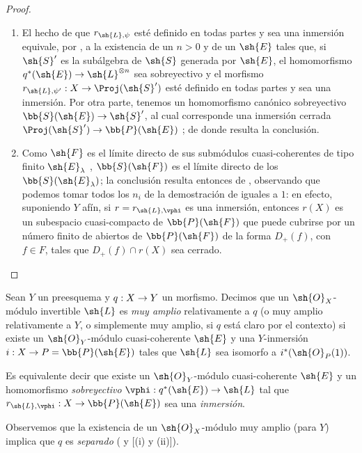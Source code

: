 \documentclass[oneside,10pt]{amsart}
\makeatletter
\newcommand{\ega@arrow}[2]{\mathchoice{#1}{#2}{#2}{#2}}
\renewcommand{\to}{\ega@arrow{\longrightarrow}{\rightarrow}}
\let\EGAOriginalLabel\label
\renewcommand{\label}[1]{\phantomsection\EGAOriginalLabel{#1}}
\makeatother
\begin{document}
\begin{proof}
\medskip\noindent
\begin{enumerate}
  \item[\rm{(i)}] El hecho de que $r_{\sh{L},\psi}$ esté definido en todas partes y sea una inmersión equivale, por , a la existencia de un $n>0$ y de un $\sh{E}$ tales que, si $\sh{S}'$ es la subálgebra de $\sh{S}$ generada por $\sh{E}$, el homomorfismo $q^*(\sh{E})\to\sh{L}^{\otimes n}$ sea sobreyectivo y el morfismo $r_{\sh{L},\psi'}:X\to\Proj(\sh{S}')$ esté definido en todas partes y sea una inmersión.
    Por otra parte, tenemos un homomorfismo canónico sobreyectivo $\bb{S}(\sh{E})\to\sh{S}'$, al cual corresponde una inmersión cerrada $\Proj(\sh{S}')\to\bb{P}(\sh{E})$ ;
    de donde resulta la conclusión.
  \item[\rm{(ii)}] Como $\sh{F}$ es el límite directo de sus submódulos cuasi-coherentes de tipo finito $\sh{E}_\lambda$ , $\bb{S}(\sh{F})$ es el límite directo de los $\bb{S}(\sh{E}_\lambda)$;
    la conclusión resulta entonces de , observando que podemos tomar todos los $n_i$ de la demostración de  iguales a $1$:
    en efecto, suponiendo $Y$ afín, si $r=r_{\sh{L},\vphi}$ es una inmersión, entonces $r(X)$ es un subespacio cuasi-compacto de $\bb{P}(\sh{F})$ que puede cubrirse por un número finito de abiertos de $\bb{P}(\sh{F})$ de la forma $D_+(f)$, con $f\in F$, tales que $D_+(f)\cap r(X)$ sea cerrado.
\end{enumerate}
\end{proof}

\begin{definition}[4.4.2]
\label{II.4.4.2}
Sean $Y$ un preesquema y $q:X\to Y$ un morfismo.
Decimos que un $\sh{O}_X$-módulo invertible $\sh{L}$ es \emph{muy amplio} relativamente a $q$ \textup{(o} muy amplio relativamente a $Y$\textup{, o simplemente} muy amplio\textup{, si $q$ está claro por el contexto)} si existe un $\sh{O}_Y$-módulo cuasi-coherente $\sh{E}$ y una $Y$-inmersión $i:X\to P=\bb{P}(\sh{E})$ tales que $\sh{L}$ sea isomorfo a $i^*(\sh{O}_P(1))$.
\end{definition}

Es equivalente  decir que existe un $\sh{O}_Y$-módulo cuasi-coherente $\sh{E}$ y un homomorfismo \emph{sobreyectivo} $\vphi:q^*(\sh{E})\to\sh{L}$ tal que $r_{\sh{L},\vphi}:X\to\bb{P}(\sh{E})$ sea una \emph{inmersión}.

Observemos que la existencia de un $\sh{O}_X$-módulo muy amplio (para $Y$) implica que $q$ es \emph{separado} ( y [(i) y (ii)]).
\end{document}
